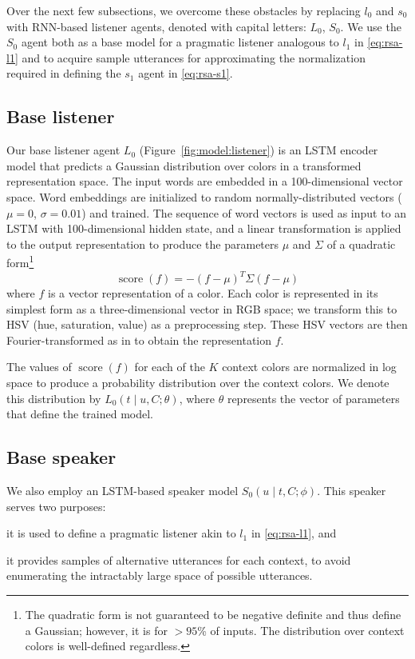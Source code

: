 \documentclass[11pt,letterpaper]{article}
\newcommand{\Listener}{L}
\newcommand{\Speaker}{S}
\newcommand{\utt}{u}
\newcommand{\context}{C}
\newcommand{\contextlen}{K}
\newcommand{\target}{t}
\newcommand{\feat}{f}
\renewcommand{\|}{\mid}
\newcommand{\figref}[1]{Figure~\ref{#1}}
\begin{document}
Over the next few subsections, we overcome these obstacles by
replacing $l_{0}$ and $s_0$ with RNN-based listener agents,
denoted with
capital letters: $\Listener_0$, $\Speaker_0$.
We use the $\Speaker_0$ agent both as a base model for a pragmatic listener
analogous to $l_1$ in \eqref{eq:rsa-l1} and to acquire sample
utterances for approximating the normalization required in defining
the $s_{1}$ agent in \eqref{eq:rsa-s1}.

\subsection{Base listener}

Our base listener agent $\Listener_0$ (\figref{fig:model:listener}) is an LSTM encoder model that predicts a Gaussian
distribution over colors in a transformed representation space.
The input words are embedded in a 100-dimensional vector space. Word embeddings
are initialized to random normally-distributed vectors ($\mu = 0$, $\sigma = 0.01$)
and trained. The sequence of word vectors is
used as input to an LSTM with 100-dimensional hidden state, and a linear
transformation is applied to the output representation to produce the parameters
$\mu$ and $\Sigma$ of a quadratic form\footnote{The quadratic form is not guaranteed 
to be negative definite and thus define a Gaussian; however, it is for $>95$\% of
inputs. The distribution over context colors is well-defined regardless.}
\[\operatorname{score}(\feat) = -(\feat - \mu)^T \Sigma (\feat - \mu)\]
where $\feat$ is a vector representation of a color. Each color is represented in
its simplest form as a three-dimensional vector in
RGB space; we transform this to HSV (hue, saturation,
value) as a preprocessing step. These HSV vectors are then Fourier-transformed as in  to obtain the representation $\feat$.

The values of $\operatorname{score}(\feat)$ for each of the $\contextlen$
context colors are normalized in log space to
produce a probability distribution over the context colors. We denote this
distribution by $\Listener_0(\target \| \utt, \context; \theta)$, where $\theta$ represents the
vector of parameters that define the trained model.

\subsection{Base speaker}\label{sec:s0}

We also employ an LSTM-based speaker model
$\Speaker_0(\utt \| \target, \context; \phi)$. This speaker serves two purposes:
\begin{enumerate*}[label=\arabic*)]
\item it is used to define a pragmatic listener akin to $l_1$ in \eqref{eq:rsa-l1},
and
\item it provides samples of alternative utterances for each context, to avoid
enumerating the intractably large space of possible utterances.
\end{enumerate*}
\end{document}
